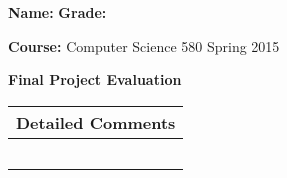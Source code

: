 \documentclass[letterpaper, 10pt]{article} %
\begin{document}
\pagestyle{empty}

\vspace*{-1.2in}

\noindent
{\bf Name:} \hspace*{4.8in} {\bf Grade:} 

\vspace*{.1in}

\noindent
{\bf Course:} Computer Science 580 Spring 2015

\vspace*{.1in}



\large{

\begin{center}{\bf Final Project Evaluation} \end{center}

\begin{tabular}{l}

\begin{minipage}{6in} \hspace*{-.25in} {\bf Detailed Comments} \vspace*{.25in} \end{minipage} \\ \hline

\begin{minipage}{6in} \vspace*{.25in} \end{minipage} \\ \hline

\begin{minipage}{6in} \vspace*{.25in} \end{minipage} \\ \hline

\begin{minipage}{6in} \vspace*{.25in} \end{minipage} \\ \hline

\begin{minipage}{6in} \vspace*{.25in} \end{minipage} \\ \hline

\begin{minipage}{6in} \vspace*{.25in} \end{minipage} \\ \hline


\end{tabular}}
\end{document}
